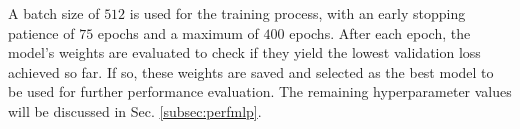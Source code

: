 A batch size of $512$ is used for the training process, with an early stopping patience of $75$ epochs and a maximum of $400$ epochs. After each epoch, the model's weights are evaluated to check if they yield
the lowest validation loss achieved so far. If so, these weights are saved and selected as the best model to be used for further performance evaluation. The remaining hyperparameter values will be discussed
in Sec. \ref{subsec:perfmlp}. \\








